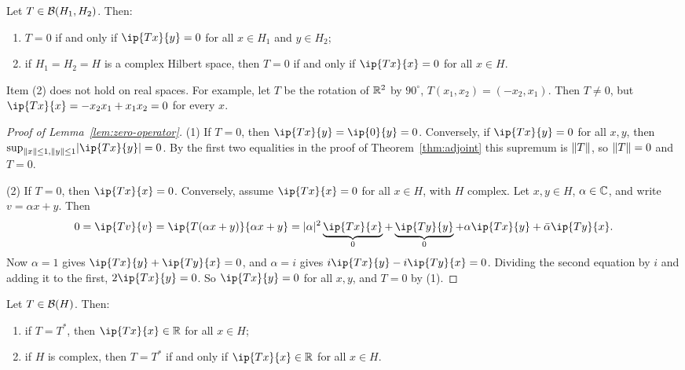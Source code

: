 \begin{lemma}\label{lem:zero-operator}
Let $T \in \mathcal{B}(H_1, H_2)$. Then:
\begin{enumerate}
  \item $T = 0$ if and only if $\ip{Tx}{y} = 0$ for all $x \in H_1$ and
    $y \in H_2$;
  \item if $H_1 = H_2 = H$ is a complex Hilbert space, then $T = 0$ if and
    only if $\ip{Tx}{x} = 0$ for all $x \in H$.
\end{enumerate}
\end{lemma}

\begin{remark}
Item (2) does not hold on real spaces. For example, let $T$ be the rotation
of $\mathbb{R}^2$ by $90^\circ$, $T(x_1, x_2) = (-x_2, x_1)$. Then $T \ne 0$, but
$\ip{Tx}{x} = -x_2 x_1 + x_1 x_2 = 0$ for every $x$.
\end{remark}

\begin{proof}[Proof of Lemma~\ref{lem:zero-operator}]
(1) If $T = 0$, then $\ip{Tx}{y} = \ip{0}{y} = 0$. Conversely, if
$\ip{Tx}{y} = 0$ for all $x, y$, then
$\sup_{\norm{x} \le 1, \norm{y} \le 1} \abs{\ip{Tx}{y}} = 0$. By the first two
equalities in the proof of Theorem~\ref{thm:adjoint} this supremum is
$\lVert T\rVert$, so $\lVert T\rVert = 0$ and $T = 0$.

(2) If $T = 0$, then $\ip{Tx}{x} = 0$. Conversely, assume $\ip{Tx}{x} = 0$
for all $x \in H$, with $H$ complex. Let $x, y \in H$, $\alpha \in \mathbb{C}$, and
write $v = \alpha x + y$. Then
\[
  0 = \ip{Tv}{v} = \ip{T(\alpha x + y)}{\alpha x + y}
  = \abs{\alpha}^2 \underbrace{\ip{Tx}{x}}_{0}
    + \underbrace{\ip{Ty}{y}}_{0}
    + \alpha\ip{Tx}{y} + \bar{\alpha}\ip{Ty}{x} .
\]
Now $\alpha = 1$ gives $\ip{Tx}{y} + \ip{Ty}{x} = 0$, and $\alpha = i$ gives
$i\ip{Tx}{y} - i\ip{Ty}{x} = 0$. Dividing the second equation by $i$ and
adding it to the first, $2\ip{Tx}{y} = 0$. So $\ip{Tx}{y} = 0$ for all
$x, y$, and $T = 0$ by (1).
\end{proof}

\begin{theorem}\label{thm:self-adjoint-real}
Let $T \in \mathcal{B}(H)$. Then:
\begin{enumerate}
  \item if $T = T^*$, then $\ip{Tx}{x} \in \R$ for all $x \in H$;
  \item if $H$ is complex, then $T = T^*$ if and only if
    $\ip{Tx}{x} \in \R$ for all $x \in H$.
\end{enumerate}
\end{theorem}

